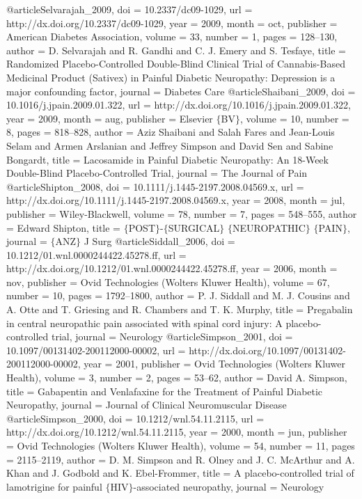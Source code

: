 @article{Selvarajah_2009,
	doi = {10.2337/dc09-1029},
	url = {http://dx.doi.org/10.2337/dc09-1029},
	year = 2009,
	month = {oct},
	publisher = {American Diabetes Association},
	volume = {33},
	number = {1},
	pages = {128--130},
	author = {D. Selvarajah and R. Gandhi and C. J. Emery and S. Tesfaye},
	title = {Randomized Placebo-Controlled Double-Blind Clinical Trial of Cannabis-Based Medicinal Product (Sativex) in Painful Diabetic Neuropathy: Depression is a major confounding factor},
	journal = {Diabetes Care}
}
@article{Shaibani_2009,
	doi = {10.1016/j.jpain.2009.01.322},
	url = {http://dx.doi.org/10.1016/j.jpain.2009.01.322},
	year = 2009,
	month = {aug},
	publisher = {Elsevier $\lbrace$BV$\rbrace$},
	volume = {10},
	number = {8},
	pages = {818--828},
	author = {Aziz Shaibani and Salah Fares and Jean-Louis Selam and Armen Arslanian and Jeffrey Simpson and David Sen and Sabine Bongardt},
	title = {Lacosamide in Painful Diabetic Neuropathy: An 18-Week Double-Blind Placebo-Controlled Trial},
	journal = {The Journal of Pain}
}
@article{Shipton_2008,
	doi = {10.1111/j.1445-2197.2008.04569.x},
	url = {http://dx.doi.org/10.1111/j.1445-2197.2008.04569.x},
	year = 2008,
	month = {jul},
	publisher = {Wiley-Blackwell},
	volume = {78},
	number = {7},
	pages = {548--555},
	author = {Edward Shipton},
	title = {$\lbrace$POST$\rbrace$-$\lbrace$SURGICAL$\rbrace$ $\lbrace$NEUROPATHIC$\rbrace$ $\lbrace$PAIN$\rbrace$},
	journal = {$\lbrace$ANZ$\rbrace$ J Surg}
}
@article{Siddall_2006,
	doi = {10.1212/01.wnl.0000244422.45278.ff},
	url = {http://dx.doi.org/10.1212/01.wnl.0000244422.45278.ff},
	year = 2006,
	month = {nov},
	publisher = {Ovid Technologies (Wolters Kluwer Health)},
	volume = {67},
	number = {10},
	pages = {1792--1800},
	author = {P. J. Siddall and M. J. Cousins and A. Otte and T. Griesing and R. Chambers and T. K. Murphy},
	title = {Pregabalin in central neuropathic pain associated with spinal cord injury: A placebo-controlled trial},
	journal = {Neurology}
}
@article{Simpson_2001,
	doi = {10.1097/00131402-200112000-00002},
	url = {http://dx.doi.org/10.1097/00131402-200112000-00002},
	year = 2001,
	publisher = {Ovid Technologies (Wolters Kluwer Health)},
	volume = {3},
	number = {2},
	pages = {53--62},
	author = {David A. Simpson},
	title = {Gabapentin and Venlafaxine for the Treatment of Painful Diabetic Neuropathy},
	journal = {Journal of Clinical Neuromuscular Disease}
}
@article{Simpson_2000,
	doi = {10.1212/wnl.54.11.2115},
	url = {http://dx.doi.org/10.1212/wnl.54.11.2115},
	year = 2000,
	month = {jun},
	publisher = {Ovid Technologies (Wolters Kluwer Health)},
	volume = {54},
	number = {11},
	pages = {2115--2119},
	author = {D. M. Simpson and R. Olney and J. C. McArthur and A. Khan and J. Godbold and K. Ebel-Frommer},
	title = {A placebo-controlled trial of lamotrigine for painful $\lbrace$HIV$\rbrace$-associated neuropathy},
	journal = {Neurology}
}
